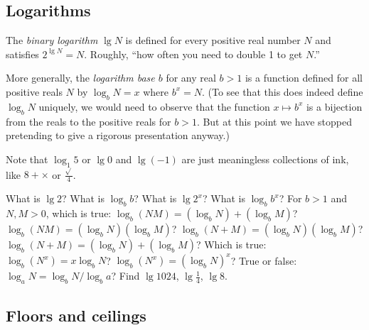 \documentclass[a4paper,nobib]{tufte-handout}
\begin{document}
\subsection{Logarithms}

\begin{marginfigure}
\end{marginfigure}

The \emph{binary logarithm} $\lg N$ is defined for every positive real
number $N$ and satisfies $2^{\lg N} = N$. Roughly,
``how often you need to double 1 to get $N$.''

More generally, the \emph{logarithm base $b$} for any real $b>1$ is a
function defined for all positive reals $N$ by $\log_b N
= x$ where $b^x= N$.  (To see that this does indeed define $\log_b N$
uniquely, we would need to observe that the function $x\mapsto b^x$ is a bijection
from the reals to the positive reals for $b>1$. But at this point
we have stopped pretending to give a rigorous presentation anyway.)

Note that $\log_1 5$ or $\lg 0$ and $\lg(-1)$ are just meaningless
collections of ink, like $8+\times$ or $\frac{\sqrt{} }{4}$.

\begin{ExerciseList}
\Exercise What is $\lg 2$? What is $\log_b b$?
\Exercise What is $\lg 2^x$? What is $\log_b b^x$?
\Exercise For $b>1$ and $N,M>0$, which is true: 
  $\log_b (NM)= (\log_b N) + (\log_b M)$? 
  $\log_b (NM)= (\log_b N)( \log_b M)$? 
  $\log_b (N+M)= (\log_b N)( \log_b M)$? 
  $\log_b (N+M)= (\log_b N) + ( \log_b M)$? 
\Exercise Which is true: $\log_b (N^x)= x\log_b N$?
  $\log_b (N^x)= (\log_b N)^x$?
\Exercise True or false: $\log_a N = \log_b N / \log_b a$?
\Exercise Find $\lg 1024$, $\lg \frac{1}{4}$, $\lg 8$.
\end{ExerciseList}


\subsection{Floors and ceilings}
\end{document}
